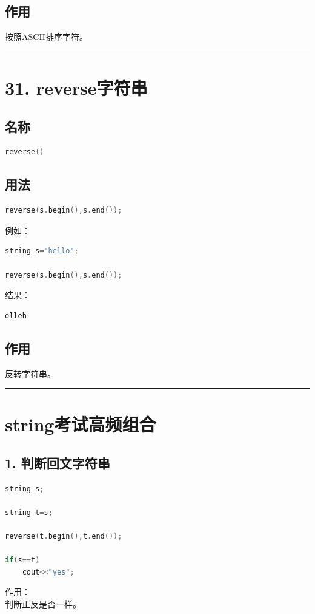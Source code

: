 \documentclass[10pt,twocolumn]{extarticle}
\begin{document}
\subsection{作用}
按照ASCII排序字符。

\noindent\rule{\linewidth}{0.4pt}

\section{31. reverse字符串}

\subsection{名称}
\begin{lstlisting}[language=C++]
reverse()
\end{lstlisting}

\subsection{用法}
\begin{lstlisting}[language=C++]
reverse(s.begin(),s.end());
\end{lstlisting}
例如：
\begin{lstlisting}[language=C++]
string s="hello";

reverse(s.begin(),s.end());
\end{lstlisting}
结果：
\begin{lstlisting}
olleh
\end{lstlisting}

\subsection{作用}
反转字符串。

\noindent\rule{\linewidth}{0.4pt}

\section{string考试高频组合}

\subsection{1. 判断回文字符串}
\begin{lstlisting}[language=C++]
string s;

string t=s;

reverse(t.begin(),t.end());

if(s==t)
    cout<<"yes";
\end{lstlisting}
作用：\\
判断正反是否一样。
\end{document}

